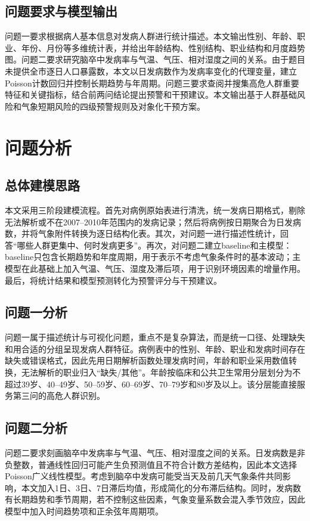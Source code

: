 \documentclass[UTF8,a4paper,12pt]{ctexart}
\begin{document}
\subsection{问题要求与模型输出}
问题一要求根据病人基本信息对发病人群进行统计描述。本文输出性别、年龄、职业、年份、月份等多维统计表，并给出年龄结构、性别结构、职业结构和月度趋势图。问题二要求研究脑卒中发病率与气温、气压、相对湿度之间的关系。由于题目未提供全市逐日人口暴露数，本文以日发病数作为发病率变化的代理变量，建立Poisson计数回归并控制长期趋势与年周期。问题三要求查阅并搜集高危人群重要特征和关键指标，结合前两问结论提出预警和干预建议。本文输出基于人群基础风险和气象短期风险的四级预警规则及对象化干预方案。

\section{问题分析}
\subsection{总体建模思路}
本文采用三阶段建模流程。首先对病例原始表进行清洗，统一发病日期格式，剔除无法解析或不在2007--2010年范围内的发病记录；然后将病例按日期聚合为日发病数，并将气象附件转换为逐日结构化表。其次，对问题一进行描述性统计，回答“哪些人群更集中、何时发病更多”。再次，对问题二建立baseline和主模型：baseline只包含长期趋势和年度周期，用于表示不考虑气象条件时的基本波动；主模型在此基础上加入气温、气压、湿度及滞后项，用于识别环境因素的增量作用。最后，将统计结果和模型预测转化为预警评分与干预建议。

\subsection{问题一分析}
问题一属于描述统计与可视化问题，重点不是复杂算法，而是统一口径、处理缺失和用合适的分组呈现发病人群特征。病例表中的性别、年龄、职业和发病时间存在缺失或错误格式，因此先用日期解析函数处理发病时间，年龄和职业采用数值转换，无法解析的职业归入“缺失/其他”。年龄按临床和公共卫生常用分层划分为不超过39岁、40--49岁、50--59岁、60--69岁、70--79岁和80岁及以上。该分层能直接服务第三问的高危人群识别。

\subsection{问题二分析}
问题二要求刻画脑卒中发病率与气温、气压、相对湿度之间的关系。日发病数是非负整数，普通线性回归可能产生负预测值且不符合计数方差结构，因此本文选择Poisson广义线性模型。考虑到脑卒中发病可能受当天及前几天气象条件共同影响，本文加入1日、3日、7日滞后均值，形成简化的分布滞后结构。同时，发病数有长期趋势和季节周期，若不控制这些因素，气象变量系数会混入季节效应，因此模型中加入时间趋势项和正余弦年周期项。
\end{document}
